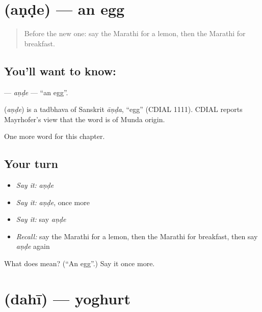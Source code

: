 \section[\texorpdfstring{\mr{अंडे} (aṇḍe)}{अंडे (aṇḍe)}]{ (aṇḍe) — an egg}

\label{lesson:MR-C88-ande}



\begin{quote}
Before the new one: say the Marathi for a lemon, then the Marathi for breakfast.
\end{quote}

\subsection*{You'll want to know: }
\textbf{} — \emph{aṇḍe} — \textquotedblleft{}an egg\textquotedblright{}.

\begin{cousinweb}
\textbf{} (\emph{aṇḍe}) is a tadbhava of Sanskrit \emph{āṇḍa}, \textquotedblleft{}egg\textquotedblright{} (CDIAL 1111). CDIAL reports Mayrhofer's view that the word is of Munda origin.
\end{cousinweb}

\begin{grammarlens}[title={What you've built}]
One more word for this chapter.
\end{grammarlens}

\subsection*{Your turn}
\begin{itemize}
\raggedright
  \item \emph{Say it:} \emph{aṇḍe}
  \item \emph{Say it:} \emph{aṇḍe}, once more
  \item \emph{Say it:} say \emph{aṇḍe}
  \item \emph{Recall:} say the Marathi for a lemon, then the Marathi for breakfast, then say \emph{aṇḍe} again
\end{itemize}

\begin{tcolorbox}[breakable,colback=teal!4,colframe=teal!35!black,title={Before you move on}]
What does  mean? (\textquotedblleft{}An egg\textquotedblright{}.) Say it once more.
\end{tcolorbox}
\section[\texorpdfstring{\mr{दही} (dahī)}{दही (dahī)}]{ (dahī) — yoghurt}

